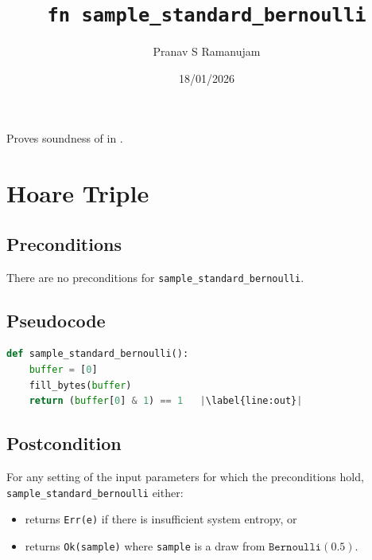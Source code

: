 \documentclass{article}
\title{\texttt{fn sample\_standard\_bernoulli}}
\author{Pranav S Ramanujam}\date{18/01/2026}
\begin{document}
\maketitle

\contrib
Proves soundness of 
in .

\section{Hoare Triple}

\subsection*{Preconditions}
\noindent
There are no preconditions for \texttt{sample\_standard\_bernoulli}.

\subsection*{Pseudocode}
\begin{lstlisting}[language = Python, escapechar=|]
def sample_standard_bernoulli():
    buffer = [0]
    fill_bytes(buffer)
    return (buffer[0] & 1) == 1   |\label{line:out}|
\end{lstlisting}

\subsection*{Postcondition}

\begin{theorem}
For any setting of the input parameters for which the preconditions hold,
\texttt{sample\_standard\_bernoulli} either:
\begin{itemize}
    \item returns \texttt{Err(e)} if there is insufficient system entropy, or
    \item returns \texttt{Ok(sample)} where \texttt{sample} is a draw from
    $\texttt{Bernoulli}(0.5)$.
\end{itemize}
\end{theorem}
\end{document}
